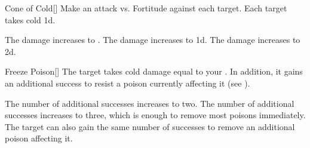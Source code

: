 \lowercase{\hypertarget{spell:Cone of Cold}{}}\label{spell:Cone of Cold}
\begin{freeability}[Rank 1]{\hypertarget{spell:Cone of Cold}{Cone of Cold}}[]
Make an attack vs. Fortitude against each target.
\hit Each target takes cold  \minus1d.

\rankline
{} The damage increases to .
 The damage increases to  \plus1d.
 The damage increases to  \plus2d.

\end{freeability}
\vspace{0.25em}



\lowercase{\hypertarget{spell:Freeze Poison}{}}\label{spell:Freeze Poison}
\begin{freeability}[Rank 1]{\hypertarget{spell:Freeze Poison}{Freeze Poison}}[]
The target takes cold damage equal to your .
In addition, it gains an additional success to resist a poison currently affecting it (see ).

\rankline
{} The number of additional successes increases to two.
 The number of additional successes increases to three, which is enough to remove most poisons immediately.
 The target can also gain the same number of successes to remove an additional poison affecting it.

\end{freeability}
\vspace{0.25em}



